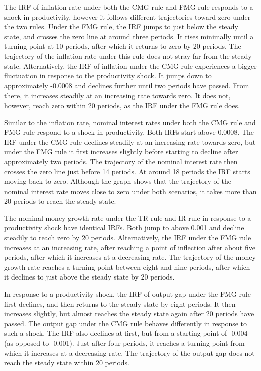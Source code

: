 \documentclass[11pt,preprint, authoryear]{elsarticle}
\numberwithin{equation}{section}
\numberwithin{figure}{section}
\numberwithin{table}{section}
\begin{document}
The IRF of inflation rate under both the CMG rule and FMG rule responds
to a shock in productivity, however it follows different trajectories
toward zero under the two rules. Under the FMG rule, the IRF jumps to
just below the steady state, and crosses the zero line at around three
periods. It rises minimally until a turning point at 10 periods, after
which it returns to zero by 20 periods. The trajectory of the inflation
rate under this rule does not stray far from the steady state.
Alternatively, the IRF of inflation under the CMG rule experiences a
bigger fluctuation in response to the productivity shock. It jumps down
to approximately -0.0008 and declines further until two periods have
passed. From there, it increases steadily at an increasing rate towards
zero. It does not, however, reach zero within 20 periods, as the IRF
under the FMG rule does.

Similar to the inflation rate, nominal interest rates under both the CMG
rule and FMG rule respond to a shock in productivity. Both IRFs start
above 0.0008. The IRF under the CMG rule declines steadily at an
increasing rate towards zero, but under the FMG rule it first increases
slightly before starting to decline after approximately two periods. The
trajectory of the nominal interest rate then crosses the zero line just
before 14 periods. At around 18 periods the IRF starts moving back to
zero. Although the graph shows that the trajectory of the nominal
interest rate moves close to zero under both scenarios, it takes more
than 20 periods to reach the steady state.

The nominal money growth rate under the TR rule and IR rule in response
to a productivity shock have identical IRFs. Both jump to above 0.001
and decline steadily to reach zero by 20 periods. Alternatively, the IRF
under the FMG rule increases at an increasing rate, after reaching a
point of inflection after about five periods, after which it increases
at a decreasing rate. The trajectory of the money growth rate reaches a
turning point between eight and nine periods, after which it declines to
just above the steady state by 20 periods.

In response to a productivity shock, the IRF of output gap under the FMG
rule first declines, and then returns to the steady state by eight
periods. It then increases slightly, but almost reaches the steady state
again after 20 periods have passed. The output gap under the CMG rule
behaves differently in response to such a shock. The IRF also declines
at first, but from a starting point of -0.004 (as opposed to -0.001).
Just after four periods, it reaches a turning point from which it
increases at a decreasing rate. The trajectory of the output gap does
not reach the steady state within 20 periods.
\end{document}
